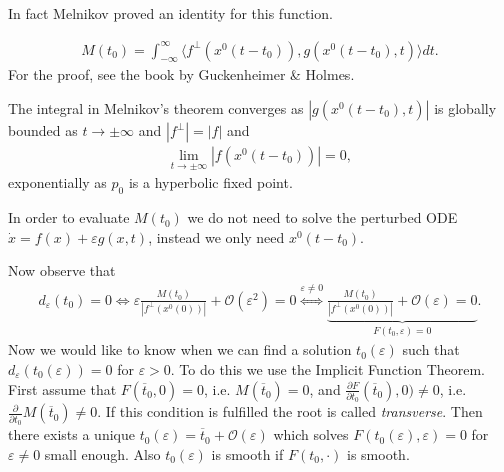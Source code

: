 In fact Melnikov proved an identity for this function.
\begin{theorem}[Melnikov]
	\begin{align}
		M(t_0) = \int_{-\infty }^{\infty }  \langle f^{\perp}(x^{0}(t-t_0)), g(x^{0}(t-t_0),t)\rangle dt.
	\end{align}
	For the proof, see the book by Guckenheimer \& Holmes.	
\end{theorem}
\begin{remark}[]
	The integral in Melnikov's theorem converges as $|g(x^{0}(t-t_0),t)|$ is globally bounded as $t \to \pm \infty $ and $|f^{\perp}| = |f|$ and
	\begin{align}
		\lim_{t\to \pm \infty }\left| f(x^{0}(t-t_0)) \right| =0,
	\end{align}
	exponentially as $p_0$ is a hyperbolic fixed point.	
\end{remark}

\begin{remark}[]
	In order to evaluate $M(t_0)$ we do not need to solve the perturbed ODE $\dot{x} =f(x) + \varepsilon g(x,t)$, instead we only need $x^{0}(t-t_0)$.
\end{remark}

Now observe that
\begin{align}
	d_{\varepsilon} (t_0) = 0 \iff \varepsilon \frac{M(t_0)}{\left| f^{\perp}(x^{0}(0))\right|} + \mathcal{O}(\varepsilon^2) = 0 \overset{\varepsilon \neq 0}{\iff} \underbrace{\frac{M(t_0)}{\left| f^{\perp}(x^{0}(0)) \right|} + \mathcal{O}(\varepsilon)=0}_{F(t_0, \varepsilon) = 0}.
\end{align}
Now we would like to know when we can find a solution $t_0(\varepsilon)$ such that $d_{\varepsilon}(t_0(\varepsilon))=0$ for $\varepsilon > 0$. To do this we use the Implicit Function Theorem. First assume that $F(\overline{t}_{0}, 0) = 0$, i.e. $M(\overline{t}_0) = 0$, and $\frac{\partial F}{\partial t_0}(\overline{t}_0), 0) \neq 0$, i.e. $\frac{\partial }{\partial t_0}M(\overline{t}_0) \neq 0$. If this condition is fulfilled the root is called \emph{transverse}.  Then there exists a unique $t_0(\varepsilon) = \overline{t}_{0} + \mathcal{O}(\varepsilon)$ which solves $F(t_0(\varepsilon), \varepsilon)=0$ for $\varepsilon \neq 0$ small enough. Also $t_0(\varepsilon)$ is smooth if $F(t_0,\cdot)$ is smooth.

